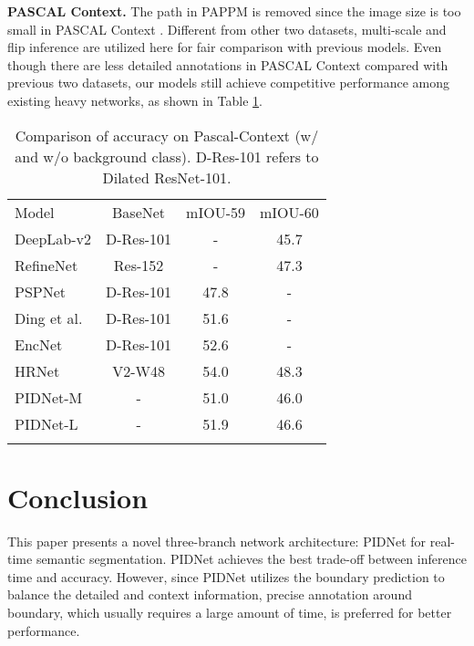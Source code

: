 \documentclass[10pt,twocolumn,letterpaper]{article}
\begin{document}
\noindent
\textbf{PASCAL Context.} The  path in PAPPM is removed since the image size is too small in PASCAL Context \cite{pascal_context}. Different from other two datasets, multi-scale and flip inference are utilized here for fair comparison with previous models. Even though there are less detailed annotations in PASCAL Context compared with previous two datasets, our models still achieve competitive performance among existing heavy networks, as shown in Table \ref{tab:pascal}.  \begin{table}[ht]
\centering
\begin{tabular}{lccc} 
\Xhline{1pt}
Model            & BaseNet & mIOU-59  & mIOU-60    \\ 
\Xhline{1pt}
DeepLab-v2\cite{deeplabv2}   & D-Res-101 & -  & 45.7   \\ 
\hline
RefineNet \cite{refinenet}   & Res-152 & -  & 47.3   \\ 
\hline
PSPNet  \cite{pspnet}       & D-Res-101 & 47.8  & -   \\ 
\hline
Ding et al.  \cite{ding2018context}    & D-Res-101  & 51.6 & - \\ 
\hline
EncNet  \cite{encnet}    & D-Res-101  & 52.6 & - \\ 
\hline
HRNet \cite{hrnet}    & V2-W48  & 54.0 & 48.3 \\ 
\hline
PIDNet-M        & -  & 51.0  & 46.0 \\
PIDNet-L        & -   & 51.9 & 46.6    \\
\Xhline{1pt}
\end{tabular}
\caption{Comparison of accuracy on Pascal-Context (w/ and w/o background class). D-Res-101 refers to Dilated ResNet-101.}
\label{tab:pascal}
\end{table}

\section{Conclusion}
\label{sec:conclusion}
This paper presents a novel three-branch network architecture: PIDNet for real-time semantic segmentation. PIDNet achieves the best trade-off between inference time and accuracy. However, since PIDNet utilizes the boundary prediction to balance the detailed and context information, precise annotation around boundary, which usually requires a large amount of time, is preferred for better performance.





{\small


}
\end{document}

